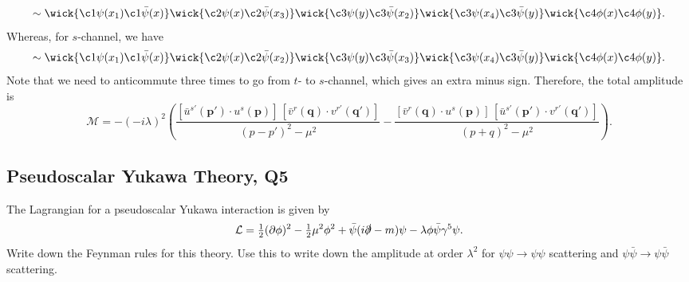 \begin{solution}
    \begin{equation}
        \sim \wick{
            \c1\psi(x_1)\c1{\bar\psi}(x)}
            \wick{
            \c2{\psi}(x)
            \c2{\bar\psi}(x_3)}
            \wick{\c3\psi(y)
            \c3{\bar\psi}(x_2)}
            \wick{\c3\psi(x_4)
            \c3{\bar\psi}(y)}
            \wick{
            \c4\phi(x)\c4\phi(y)}.
    \end{equation}
    Whereas, for $s$-channel, we have
    \begin{equation}
        \sim \wick{
            \c1\psi(x_1)\c1{\bar\psi}(x)}
            \wick{
            \c2{\psi}(x)
            \c2{\bar\psi}(x_2)}
            \wick{\c3\psi(y)
            \c3{\bar\psi}(x_3)}
            \wick{\c3\psi(x_4)
            \c3{\bar\psi}(y)}
            \wick{
            \c4\phi(x)\c4\phi(y)}.
    \end{equation}
    Note that we need to anticommute three times to go from $t$- to $s$-channel, which gives an extra minus sign.
    Therefore, the total amplitude is
    \begin{equation}
        \mathcal{M} = -(-i\lambda)^2\left(\frac{[\bar{u}^{s'}(\mathbf{p}')\cdot u^s(\mathbf{p})]\,[\bar{v}^r(\mathbf{q})\cdot v^{r'}(\mathbf{q}')]}{(p-p')^2-\mu^2} - \frac{[\bar{v}^r(\mathbf{q})\cdot u^s(\mathbf{p})]\,[\bar{u}^{s'}(\mathbf{p}')\cdot v^{r'}(\mathbf{q}')]}{(p+q)^2-\mu^2}\right).
    \end{equation}
\end{solution}

\subsection{Pseudoscalar Yukawa Theory, Q5}

The Lagrangian for a pseudoscalar Yukawa interaction is given by
\begin{equation}
    \mathcal{L} = \tfrac{1}{2}(\partial\phi)^2 - \tfrac{1}{2}\mu^2\phi^2 + \bar\psi(i\slashed{\partial}-m)\psi - \lambda\phi\bar\psi\gamma^5\psi.
\end{equation}
Write down the Feynman rules for this theory. Use this to write down the amplitude at order $\lambda^2$ for $\psi\psi\to\psi\psi$ scattering and $\psi\bar\psi\to\psi\bar\psi$ scattering.

